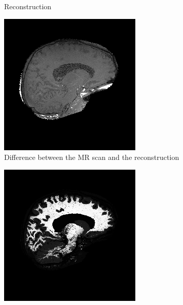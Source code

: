 \documentclass[10pt,twoside]{book}
\begin{document}
\begin{figure}
\begin{subfigure}[t]{0.3\textwidth}
    \caption{Reconstruction}
    \label{fig:biasFieldEquationIllustration_b}
  \end{subfigure}
  \hfill
  \begin{subfigure}[t]{0.3\textwidth}
    \centering
    \includegraphics[width=\textwidth]{biasFieldEstimationResidue}
    \caption{Difference between the MR scan and the reconstruction} 
    \label{fig:biasFieldEquationIllustration_c}
  \end{subfigure}
  \begin{subfigure}{0.3\textwidth}
    \centering
    \includegraphics[width=\textwidth]{biasFieldEstimationWeights}

\end{subfigure}
\end{figure}
\end{document}
